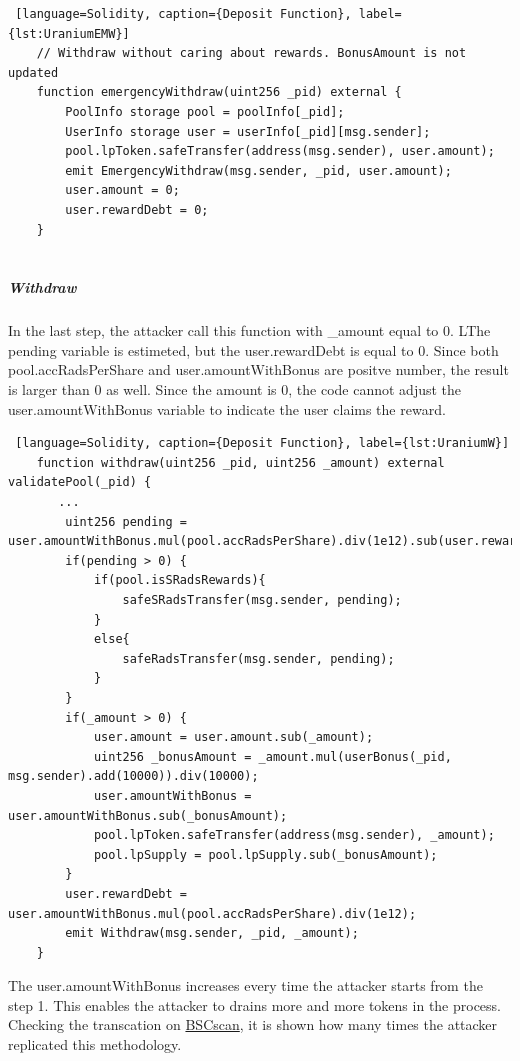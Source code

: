 \begin{lstlisting} [language=Solidity, caption={Deposit Function}, label={lst:UraniumEMW}]
    // Withdraw without caring about rewards. BonusAmount is not updated
    function emergencyWithdraw(uint256 _pid) external {
        PoolInfo storage pool = poolInfo[_pid];
        UserInfo storage user = userInfo[_pid][msg.sender];
        pool.lpToken.safeTransfer(address(msg.sender), user.amount);
        emit EmergencyWithdraw(msg.sender, _pid, user.amount);
        user.amount = 0;
        user.rewardDebt = 0;
    }
    
\end{lstlisting} 

\subparagraph{Withdraw} In the last step, the attacker call this function with \_amount equal to 0.
LThe pending variable is estimeted, but the user.rewardDebt is equal to 0.
Since both pool.accRadsPerShare and user.amountWithBonus are positve number, the result is larger than 0 as well.
Since the amount is 0, the code cannot adjust the user.amountWithBonus variable to indicate the user claims the reward.

\begin{lstlisting} [language=Solidity, caption={Deposit Function}, label={lst:UraniumW}]
    function withdraw(uint256 _pid, uint256 _amount) external validatePool(_pid) {
       ...
        uint256 pending = user.amountWithBonus.mul(pool.accRadsPerShare).div(1e12).sub(user.rewardDebt);
        if(pending > 0) {
            if(pool.isSRadsRewards){
                safeSRadsTransfer(msg.sender, pending);
            }
            else{
                safeRadsTransfer(msg.sender, pending);
            }
        }
        if(_amount > 0) {
            user.amount = user.amount.sub(_amount);
            uint256 _bonusAmount = _amount.mul(userBonus(_pid, msg.sender).add(10000)).div(10000);
            user.amountWithBonus = user.amountWithBonus.sub(_bonusAmount);
            pool.lpToken.safeTransfer(address(msg.sender), _amount);
            pool.lpSupply = pool.lpSupply.sub(_bonusAmount);
        }
        user.rewardDebt = user.amountWithBonus.mul(pool.accRadsPerShare).div(1e12);
        emit Withdraw(msg.sender, _pid, _amount);
    }

\end{lstlisting} 

The user.amountWithBonus increases every time the attacker starts from the step 1. 
This enables the attacker to drains more and more tokens in the process. 
Checking the transcation on \href{https://bscscan.com/txs?a=0x36ad9ee78bfb730955993d2aa77ecccf95e3313e&p=3}{BSCscan}, it is shown how many times the attacker 
replicated this methodology. 


